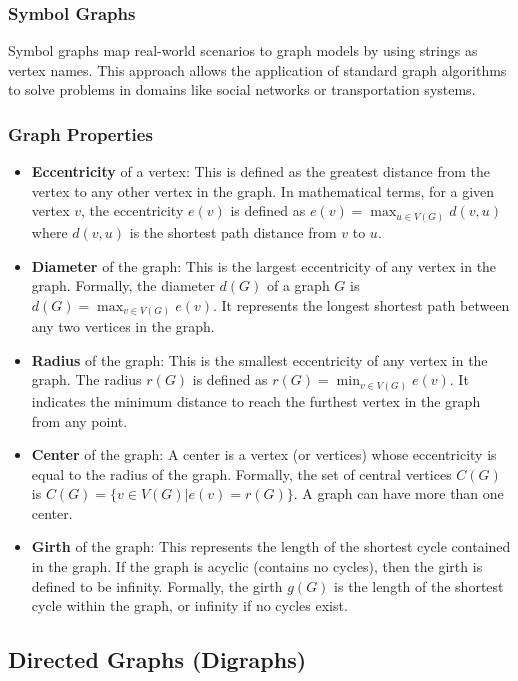\documentclass{article}
\begin{document}
\subsubsection{Symbol Graphs}
Symbol graphs map real-world scenarios to graph models by using strings as vertex names. This approach allows the application of standard graph algorithms to solve problems in domains like social networks or transportation systems.

\subsubsection{Graph Properties}

\begin{itemize}
    \item \textbf{Eccentricity} of a vertex: This is defined as the greatest distance from the vertex to any other vertex in the graph. In mathematical terms, for a given vertex $v$, the eccentricity $e(v)$ is defined as $e(v) = \max_{u \in V(G)} d(v, u)$ where $d(v, u)$ is the shortest path distance from $v$ to $u$.
    \item \textbf{Diameter} of the graph: This is the largest eccentricity of any vertex in the graph. Formally, the diameter $d(G)$ of a graph $G$ is $d(G) = \max_{v \in V(G)} e(v)$. It represents the longest shortest path between any two vertices in the graph.
    \item \textbf{Radius} of the graph: This is the smallest eccentricity of any vertex in the graph. The radius $r(G)$ is defined as $r(G) = \min_{v \in V(G)} e(v)$. It indicates the minimum distance to reach the furthest vertex in the graph from any point.
    \item \textbf{Center} of the graph: A center is a vertex (or vertices) whose eccentricity is equal to the radius of the graph. Formally, the set of central vertices $C(G)$ is $C(G) = \{v \in V(G) | e(v) = r(G)\}$. A graph can have more than one center.
    \item \textbf{Girth} of the graph: This represents the length of the shortest cycle contained in the graph. If the graph is acyclic (contains no cycles), then the girth is defined to be infinity. Formally, the girth $g(G)$ is the length of the shortest cycle within the graph, or infinity if no cycles exist.
\end{itemize}

\subsection{Directed Graphs (Digraphs)}
\end{document}
